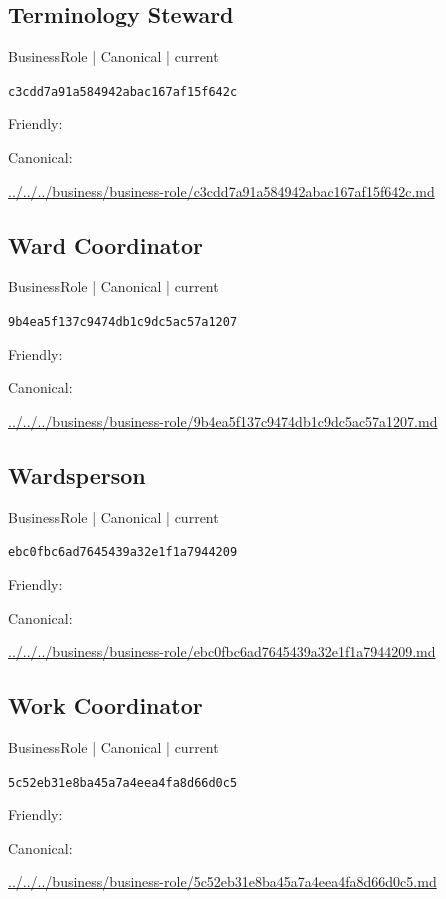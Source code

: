 \documentclass[10pt,a4paper]{article}
\begin{document}
\subsection*{Terminology Steward}
{\small BusinessRole | Canonical | current}\par
\texttt{c3cdd7a91a584942abac167af15f642c}\par
Friendly: \par
Canonical: \par
{\footnotesize\url{../../../business/business-role/c3cdd7a91a584942abac167af15f642c.md}}\par
\subsection*{Ward Coordinator}
{\small BusinessRole | Canonical | current}\par
\texttt{9b4ea5f137c9474db1c9dc5ac57a1207}\par
Friendly: \par
Canonical: \par
{\footnotesize\url{../../../business/business-role/9b4ea5f137c9474db1c9dc5ac57a1207.md}}\par
\subsection*{Wardsperson}
{\small BusinessRole | Canonical | current}\par
\texttt{ebc0fbc6ad7645439a32e1f1a7944209}\par
Friendly: \par
Canonical: \par
{\footnotesize\url{../../../business/business-role/ebc0fbc6ad7645439a32e1f1a7944209.md}}\par
\subsection*{Work Coordinator}
{\small BusinessRole | Canonical | current}\par
\texttt{5c52eb31e8ba45a7a4eea4fa8d66d0c5}\par
Friendly: \par
Canonical: \par
{\footnotesize\url{../../../business/business-role/5c52eb31e8ba45a7a4eea4fa8d66d0c5.md}}\par
\end{document}
